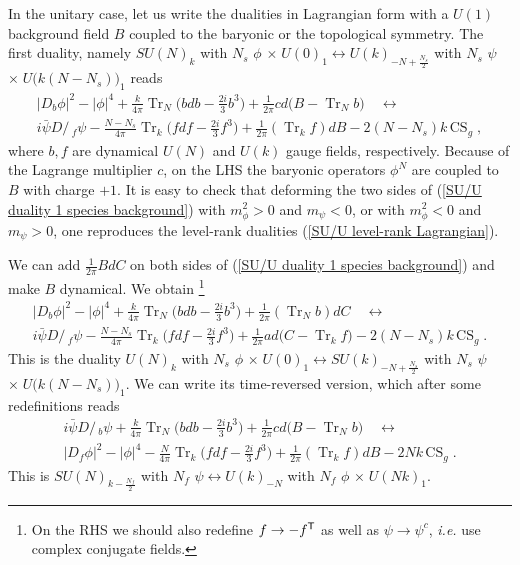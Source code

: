 \documentclass[a4paper, 12pt]{article}
\newcommand{\ie}{\textit{i.e.}}
\numberwithin{equation}{section}
\newcommand{\Dslash}{D\!\!\!\!\slash\,}
\newcommand{\sT}{{\sf{T}}}
\DeclareMathOperator{\Tr}{Tr}
\begin{document}
In the unitary case, let us write the dualities in Lagrangian form with a $U(1)$ background field $B$ coupled to the baryonic or the topological symmetry. The first duality, namely $SU(N)_k$ with $N_s$ $\phi$ $\times\; U(0)_1 \leftrightarrow U(k)_{-N + \frac{N_s}2}$ with $N_s$ $\psi$ $\times\; U\big( k(N-N_s)\big)_1$ reads \cite{Hsin:2016blu}
\begin{multline}
\label{SU/U duality 1 species background}
|D_b\phi|^2 - |\phi|^4 + \frac{k}{4\pi} \Tr_N \Big( bdb - \frac{2i}3 b^3 \Big) + \frac1{2\pi} cd\big( B -  \Tr_N b \big) \quad\longleftrightarrow \\
i \bar\psi \Dslash_f \psi - \frac{N-N_s}{4\pi} \Tr_k \Big( fdf - \frac{2i}3 f^3 \Big) + \frac1{2\pi} (\Tr_k f) dB - 2(N-N_s) k \, \text{CS}_g \;,
\end{multline}
where $b,f$ are dynamical $U(N)$ and $U(k)$ gauge fields, respectively. Because of the Lagrange multiplier $c$, on the LHS the baryonic operators $\phi^N$ are coupled to $B$ with charge $+1$. It is easy to check that deforming the two sides of (\ref{SU/U duality 1 species background}) with $m_\phi^2>0$ and $m_\psi<0$, or with $m_\phi^2<0$ and $m_\psi>0$, one reproduces the level-rank dualities (\ref{SU/U level-rank Lagrangian}).

We can add $\frac1{2\pi} BdC$ on both sides of (\ref{SU/U duality 1 species background}) and make $B$ dynamical. We obtain%
\footnote{On the RHS we should also redefine $f \to - f^\sT$ as well as $\psi \to \psi^c$, \ie{} use complex conjugate fields.}
\begin{multline}
|D_b\phi|^2 - |\phi|^4 + \frac{k}{4\pi} \Tr_N \Big( bdb - \frac{2i}3 b^3 \Big) + \frac1{2\pi} (\Tr_N b)dC \quad\longleftrightarrow \\
i \bar\psi \Dslash_f \psi - \frac{N-N_s}{4\pi} \Tr_k \Big( fdf - \frac{2i}3 f^3 \Big) + \frac1{2\pi} ad\big(C -  \Tr_k f \big) - 2(N-N_s) k \, \text{CS}_g \;.
\end{multline}
This is the duality $U(N)_k$ with $N_s$ $\phi$ $\times\; U(0)_1 \leftrightarrow SU(k)_{-N+\frac{N_s}2}$ with $N_s$ $\psi$ $\times\; U\big( k(N-N_s)\big)_1$. We can write its time-reversed version, which after some redefinitions reads
\begin{multline}
\label{SU/U duality 1 species background Trev}
i \bar\psi \Dslash_b \psi + \frac{k}{4\pi} \Tr_N \Big( bdb - \frac{2i}3 b^3 \Big) + \frac1{2\pi} c d\big( B - \Tr_N b \big)  \quad\longleftrightarrow \\
|D_f\phi|^2 - |\phi|^4 - \frac{N}{4\pi} \Tr_k \Big( fdf - \frac{2i}3 f^3 \Big)  + \frac1{2\pi} (\Tr_k f)dB - 2N k \, \text{CS}_g \;.
\end{multline}
This is $SU(N)_{k - \frac{N_f}2}$ with $N_f$ $\psi \leftrightarrow U(k)_{-N}$ with $N_f$ $\phi$ $\times\; U(Nk)_1$.
\end{document}
